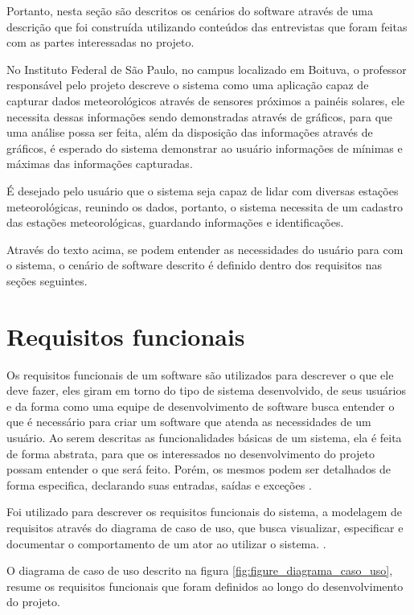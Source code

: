 Portanto, nesta seção são descritos os cenários do software através de uma descrição que foi construída utilizando conteúdos das entrevistas que foram feitas com as partes interessadas no projeto.

No Instituto Federal de São Paulo, no campus localizado em Boituva, o professor responsável pelo projeto descreve o sistema como uma aplicação capaz de capturar dados meteorológicos através de sensores próximos a painéis solares, ele necessita dessas informações sendo demonstradas através de gráficos, para que uma análise possa ser feita, além da disposição das informações através de gráficos, é esperado do sistema demonstrar ao usuário informações de mínimas e máximas das informações capturadas.

É desejado pelo usuário que o sistema seja capaz de lidar com diversas estações meteorológicas, reunindo os dados, portanto, o sistema necessita de um cadastro das estações meteorológicas, guardando informações e identificações.

Através do texto acima, se podem entender as necessidades do usuário para com o sistema, o cenário de software descrito é definido dentro dos requisitos nas seções seguintes.

\section{Requisitos funcionais}

Os requisitos funcionais de um software são utilizados para descrever o que ele deve fazer, eles giram em torno do tipo de sistema desenvolvido, de seus usuários e da forma como uma equipe de desenvolvimento de software busca entender o que é necessário para criar um software que atenda as necessidades de um usuário. Ao serem descritas as funcionalidades básicas de um sistema, ela é feita de forma abstrata, para que os interessados no desenvolvimento do projeto possam entender o que será feito. Porém, os mesmos podem ser detalhados de forma especifica, declarando suas entradas, saídas e exceções \cite{engenharia_software_sommerville}.

Foi utilizado para descrever os requisitos funcionais do sistema, a modelagem de requisitos através do diagrama de caso de uso, que busca visualizar, especificar e documentar o comportamento de um ator ao utilizar o sistema. \cite{uml_pratica}.

O diagrama de caso de uso descrito na figura \ref{fig:figure_diagrama_caso_uso}, resume os requisitos funcionais que foram definidos ao longo do desenvolvimento do projeto.

